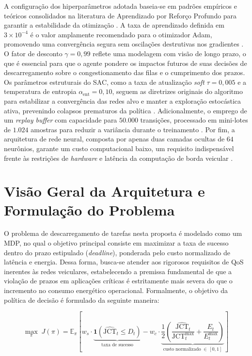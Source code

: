 A configuração dos hiperparâmetros adotada baseia-se em padrões empíricos e teóricos consolidados na literatura de Aprendizado por Reforço Profundo para garantir a estabilidade da otimização \cite{sutton2018}. A taxa de aprendizado definida em $3 \times 10^{-4}$ é o valor amplamente recomendado para o otimizador Adam, promovendo uma convergência segura sem oscilações destrutivas nos gradientes \cite{kingma2014adam}. O fator de desconto $\gamma = 0{,}99$ reflete uma modelagem com visão de longo prazo, o que é essencial para que o agente pondere os impactos futuros de suas decisões de descarregamento sobre o congestionamento das filas e o cumprimento dos prazos. Os parâmetros estruturais do \gls{SAC}, como a taxa de atualização \textit{soft} $\tau = 0{,}005$ e a temperatura de entropia $\alpha_{\text{ent}} = 0{,}10$, seguem as diretrizes originais do algoritmo para estabilizar a convergência das redes alvo e manter a exploração estocástica ativa, prevenindo colapsos prematuros da política \cite{haarnoja2018sac}. Adicionalmente, o emprego de um \textit{replay buffer} com capacidade para $50.000$ transições, processado em mini-lotes de $1.024$ amostras para reduzir a variância durante o treinamento \cite{mnih2015}. Por fim, a arquitetura de rede neural, composta por apenas duas camadas ocultas de $64$ neurônios, garante um custo computacional baixo, um requisito indispensável frente às restrições de \textit{hardware} e latência da computação de borda veicular \cite{miriyala2026}.

\section{Visão Geral da Arquitetura e Formulação do Problema}
\label{sec:arquitetura}
O problema de descarregamento de tarefas nesta proposta é modelado como um \gls{MDP}, no qual o objetivo principal consiste em maximizar a taxa de sucesso dentro do prazo estipulado (\textit{deadline}), ponderada pelo custo normalizado de latência e energia. Dessa forma, busca-se atender aos rigorosos requisitos de \gls{QoS} inerentes às redes veiculares, estabelecendo a premissa fundamental de que a violação de prazos em aplicações críticas é estritamente mais severa do que o incremento no consumo energético operacional. Formalmente, o objetivo da política de decisão é formulado da seguinte maneira:

\begin{equation}
    \max_{\pi}\; J(\pi) = \mathbb{E}_{\pi}\!\left[ w_s \cdot \underbrace{\mathbf{1}(\widehat{\text{JCT}}_t \leq D_t)}_{\text{taxa de sucesso}} - w_c \cdot \underbrace{\frac{1}{2}\!\left(\frac{\widehat{\text{JCT}}_t}{\text{JCT}^{\max}_t} + \frac{E_t}{E^{\text{max}}_t}\right)}_{\text{custo normalizado}\;\in\,[0, 1]} \right]
    \label{eq:obj_geral}
\end{equation}

